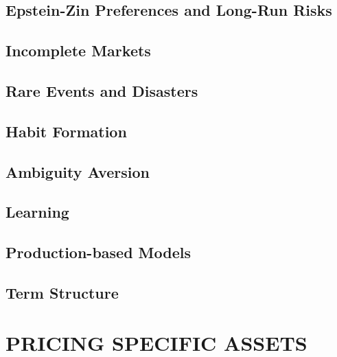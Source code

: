 \documentclass[
]{book}
\begin{document}
\hypertarget{epstein-zin-preferences-and-long-run-risks}{%
\chapter{Epstein-Zin Preferences and Long-Run Risks}\label{epstein-zin-preferences-and-long-run-risks}}

\hypertarget{incomplete-markets}{%
\chapter{Incomplete Markets}\label{incomplete-markets}}

\hypertarget{rare-events-and-disasters}{%
\chapter{Rare Events and Disasters}\label{rare-events-and-disasters}}

\hypertarget{habit-formation}{%
\chapter{Habit Formation}\label{habit-formation}}

\hypertarget{ambiguity-aversion}{%
\chapter{Ambiguity Aversion}\label{ambiguity-aversion}}

\hypertarget{learning}{%
\chapter{Learning}\label{learning}}

\hypertarget{production-based-models}{%
\chapter{Production-based Models}\label{production-based-models}}

\hypertarget{term-structure}{%
\chapter{Term Structure}\label{term-structure}}

\hypertarget{part-pricing-specific-assets}{%
\part*{PRICING SPECIFIC ASSETS}\label{part-pricing-specific-assets}}
\end{document}

